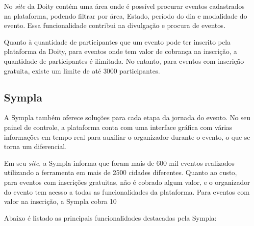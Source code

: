 No \textit{site} da Doity contém uma área onde é possível procurar eventos cadastrados na plataforma, podendo filtrar por área, Estado, período do dia e modalidade do evento. Essa funcionalidade contribui na divulgação e procura de eventos.

Quanto à quantidade de participantes que um evento pode ter inscrito pela plataforma da Doity, para eventos onde tem valor de cobrança na inscrição, a quantidade de participantes é ilimitada. No entanto, para eventos com inscrição gratuita, existe um limite de até 3000 participantes. 

\subsection{Sympla}

A Sympla também oferece soluções para cada etapa da jornada do evento. No seu painel de controle, a plataforma conta com uma interface gráfica com várias informações em tempo real para auxiliar o organizador durante o evento, o que se torna um diferencial.

Em seu \textit{site}, a Sympla informa que foram mais de 600 mil eventos realizados utilizando a ferramenta em mais de 2500 cidades diferentes. Quanto ao custo, para eventos com inscrições gratuitas, não é cobrado algum valor, e o organizador do evento tem acesso a todas as funcionalidades da plataforma. Para eventos com valor na inscrição, a Sympla cobra 10%

Abaixo é listado as principais funcionalidades destacadas pela Sympla:

